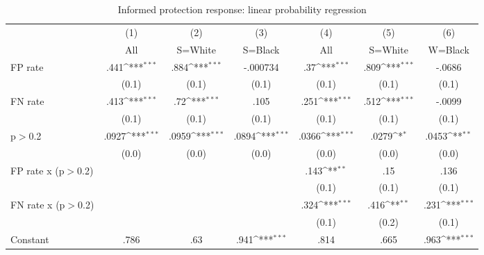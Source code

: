 \begin{table}[htbp]\centering
\def\sym#1{\ifmmode^{#1}\else\(^{#1}\)\fi}
\caption{Informed protection response: linear probability regression}
\begin{tabular}{l*{6}{c}}
\hline\hline
                &\multicolumn{1}{c}{(1)}&\multicolumn{1}{c}{(2)}&\multicolumn{1}{c}{(3)}&\multicolumn{1}{c}{(4)}&\multicolumn{1}{c}{(5)}&\multicolumn{1}{c}{(6)}\\
                &\multicolumn{1}{c}{All}&\multicolumn{1}{c}{S=White}&\multicolumn{1}{c}{S=Black}&\multicolumn{1}{c}{All}&\multicolumn{1}{c}{S=White}&\multicolumn{1}{c}{W=Black}\\
\hline
FP rate         &     .441\sym{***}&     .884\sym{***}& -.000734         &      .37\sym{***}&     .809\sym{***}&   -.0686         \\
                &    (0.1)         &    (0.1)         &    (0.1)         &    (0.1)         &    (0.1)         &    (0.1)         \\
FN rate         &     .413\sym{***}&      .72\sym{***}&     .105         &     .251\sym{***}&     .512\sym{***}&   -.0099         \\
                &    (0.1)         &    (0.1)         &    (0.1)         &    (0.1)         &    (0.1)         &    (0.1)         \\
p$>$0.2         &    .0927\sym{***}&    .0959\sym{***}&    .0894\sym{***}&    .0366\sym{***}&    .0279\sym{*}  &    .0453\sym{**} \\
                &    (0.0)         &    (0.0)         &    (0.0)         &    (0.0)         &    (0.0)         &    (0.0)         \\
FP rate x (p$>$0.2)&                  &                  &                  &     .143\sym{**} &      .15         &     .136         \\
                &                  &                  &                  &    (0.1)         &    (0.1)         &    (0.1)         \\
FN rate x (p$>$0.2)&                  &                  &                  &     .324\sym{***}&     .416\sym{**} &     .231\sym{***}\\
                &                  &                  &                  &    (0.1)         &    (0.2)         &    (0.1)         \\
Constant        &     .786         &      .63         &     .941\sym{***}&     .814         &     .665         &     .963\sym{***}\\

\end{tabular}
\end{table}
